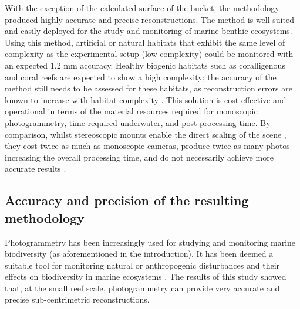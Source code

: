With the exception of the calculated surface of the bucket, the methodology produced highly accurate and precise reconstructions. The method is well-suited and easily deployed for the study and monitoring of marine benthic ecosystems. Using this method, artificial or natural habitats that exhibit the same level of complexity as the experimental setup (low complexity) could be monitored with an expected 1.2 mm accuracy. Healthy biogenic habitats such as coralligenous and coral reefs are expected to show a high complexity; the accuracy of the method still needs to be assessed for these habitats, as reconstruction errors are known to increase with habitat complexity \citep{bryson_characterization_2017, figueira_accuracy_2015}. This solution is cost-effective and operational in terms of the material resources required for monoscopic photogrammetry, time required underwater, and post-processing time. By comparison, whilst stereoscopic mounts enable the direct scaling of the scene \citep{ahmadabadian_comparison_2013}, they cost twice as much as monoscopic cameras, produce twice as many photos increasing the overall processing time, and do not necessarily achieve more accurate results \citep{figueira_accuracy_2015, abdo_efficiently_2006, bryson_characterization_2017}.

\subsection{Accuracy and precision of the resulting methodology}\label{chapitre2_4.3}
Photogrammetry has been increasingly used for studying and monitoring marine biodiversity (as aforementioned in the introduction). It has been deemed a suitable tool for monitoring natural or anthropogenic disturbances and their effects on biodiversity in marine ecosystems \citep{burns_assessing_2016}. The results of this study showed that, at the small reef scale, photogrammetry can provide very accurate and precise sub-centrimetric reconstructions. 

